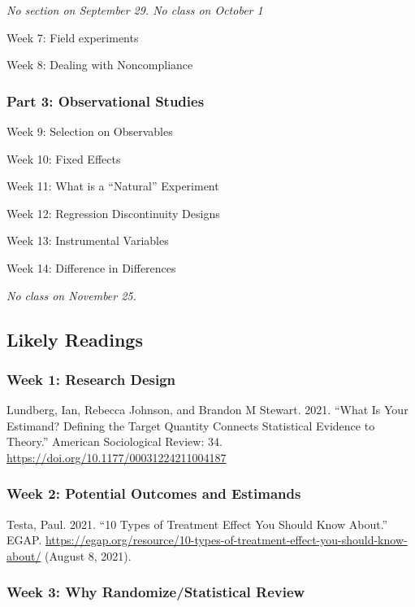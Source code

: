 \documentclass[
  11pt,
]{article}
\begin{document}
\emph{No section on September 29. No class on October 1}

Week 7: Field experiments

Week 8: Dealing with Noncompliance

\hypertarget{part-3-observational-studies}{%
\subsubsection{Part 3: Observational
Studies}\label{part-3-observational-studies}}

Week 9: Selection on Observables

Week 10: Fixed Effects

Week 11: What is a ``Natural'' Experiment

Week 12: Regression Discontinuity Designs

Week 13: Instrumental Variables

Week 14: Difference in Differences

\emph{No class on November 25.}

\hypertarget{likely-readings}{%
\subsection{Likely Readings}\label{likely-readings}}

\hypertarget{week-1-research-design}{%
\subsubsection{Week 1: Research Design}\label{week-1-research-design}}

Lundberg, Ian, Rebecca Johnson, and Brandon M Stewart. 2021. ``What Is
Your Estimand? Defining the Target Quantity Connects Statistical
Evidence to Theory.'' American Sociological Review: 34.
\url{https://doi.org/10.1177/00031224211004187}

\hypertarget{week-2-potential-outcomes-and-estimands}{%
\subsubsection{Week 2: Potential Outcomes and
Estimands}\label{week-2-potential-outcomes-and-estimands}}

Testa, Paul. 2021. ``10 Types of Treatment Effect You Should Know
About.'' EGAP.
\url{https://egap.org/resource/10-types-of-treatment-effect-you-should-know-about/}
(August 8, 2021).

\hypertarget{week-3-why-randomizestatistical-review}{%
\subsubsection{Week 3: Why Randomize/Statistical
Review}\label{week-3-why-randomizestatistical-review}}
\end{document}
